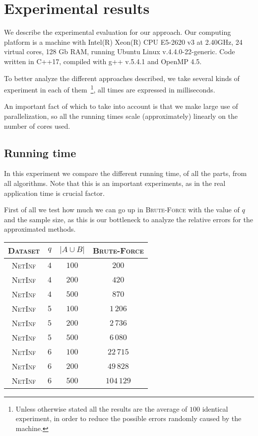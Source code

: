     \section{Experimental results}

    We describe the experimental evaluation for our approach. Our computing platform is a machine with Intel(R) Xeon(R) CPU E5-2620 v3 at 2.40GHz, 24 virtual cores, 128 Gb RAM, running Ubuntu Linux v.4.4.0-22-generic. Code written in C++17, compiled with g++ v.5.4.1 and OpenMP 4.5.\medskip
    
    To better analyze the different approaches described, we take several kinds of experiment in each of them~\footnote{Unless otherwise stated all the results are the average of $100$ identical experiment, in order to reduce the possible errors randomly caused by the machine.}, all times are expressed in milliseconds.\medskip
     
    An important fact of which to take into account is that we make large use of parallelization, 
    so all the running times scale (approximately) linearly on the number of cores used.
    
	\subsection*{Running time}
	
	In this experiment we compare the different running time, of all the parts, from all algorithms. Note that this is an important experiments, as in the real application time is crucial factor.\medskip

	First of all we test how much we can go up in \textsc{Brute-Force} with the value of $q$ and the sample size, as this is our bottleneck to analyze the relative errors for the approximated methods.\medskip 
	
	\begin{table}[h]
		\centering
		\begin{tabular}{|c|c|c|c|}
			\hline
			\textsc{Dataset} & $q$ & $|A \cup B|$ & \textsc{Brute-Force} \\ \hline \hline
			\textsc{NetInf}  & $4$ & $100$        & $200$ \\ \hline
			\textsc{NetInf}  & $4$ & $200$        & $420$ \\ \hline
			\textsc{NetInf}  & $4$ & $500$        & $870$ \\ \hline \hline
			\textsc{NetInf}  & $5$ & $100$        & $1\,206$ \\ \hline
			\textsc{NetInf}  & $5$ & $200$        & $2\,736$ \\ \hline
			\textsc{NetInf}  & $5$ & $500$        & $6\,080$ \\ \hline \hline
			\textsc{NetInf}  & $6$ & $100$        & $22\,715$ \\ \hline
			\textsc{NetInf}  & $6$ & $200$        & $49\,828$ \\ \hline
			\textsc{NetInf}  & $6$ & $500$        & $104\,129$ \\ \hline
		\end{tabular}
	\end{table}

